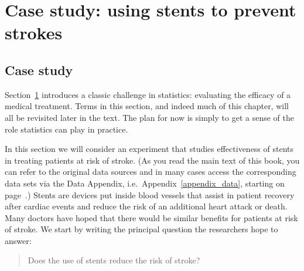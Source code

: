 \section[Case study]{Case study: using stents to prevent strokes }
\label{basicExampleOfStentsAndStrokes}

\subsection{Case study}
Section~\ref{basicExampleOfStentsAndStrokes} introduces a classic challenge in statistics: evaluating the efficacy of a medical treatment. Terms in this section, and indeed much of this chapter, will all be revisited later in the text. The plan for now is simply to get a sense of the role statistics can play in practice.

In this section we will consider an experiment that studies effectiveness of stents in treating patients at risk of stroke. (As you read the main text of this book, you can refer to the original data sources and in many cases access the corresponding data sets via the Data Appendix, i.e.~Appendix~\ref{appendix_data}, starting on page~\pageref{appendix_data}.) Stents are devices put inside blood vessels that assist in patient recovery after cardiac events and reduce the risk of an additional heart attack or death. Many doctors have hoped that there would be similar benefits for patients at risk of stroke. We start by writing the principal question the researchers hope to answer:
\begin{quote}
Does the use of stents reduce the risk of stroke?
\end{quote}

